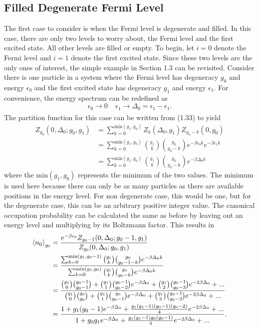 \subsection{Filled Degenerate Fermi Level}
The first case to consider is when the Fermi level is degenerate and filled. In this case, there are only two levels to worry about, the Fermi level and the first excited state. All other levels are filled or empty. To begin, let $i=0$ denote the Fermi level and $i=1$ denote the first excited state. Since these two levels are the only ones of interest, the simple example in Section 1.3 can be revisited. Consider there is one particle in a system where the Fermi level has degeneracy $g_0$ and energy $\epsilon_0$ and the first excited state has degeneracy $g_1$ and energy $\epsilon_1$. For convenience, the energy spectrum can be redefined as
\begin{equation}
    \epsilon_0 \xrightarrow[]{} 0\ \ \ \ \ \epsilon_1\xrightarrow[]{}\Delta_0=\epsilon_1-\epsilon_1.\nonumber
\end{equation}
The partition function for this case can be written from (1.33) to yield
\begin{align}
    Z_{g_0}(0,\Delta_0;g_0,g_1)&=\sum_{k=0}^{\text{min}(g_1,g_0)} Z_k(\Delta_0,g_1)Z_{g_0-k}(0,g_0)\nonumber\\
    &=\sum_{k=0}^{\text{min}(g_1,g_0)} {g_1 \choose k}{g_0\choose g_0-k} e^{-\beta \epsilon_0 k}e^{-\beta \epsilon_1 k}\nonumber\\
    &=\sum_{k=0}^{\text{min}(g_1,g_0)} {g_1 \choose k}{g_0\choose g_0-k} e^{-\beta \Delta_0 k}
\end{align}
where the $\text{min}(g_1,g_0)$ represents the minimum of the two values. The minimum is used here because there can only be as many particles as there are available positions in the energy level. For non degenerate case, this would be one, but for the degenerate case, this can be an arbitrary positive integer value. The canonical occupation probability can be calculated the same as before by leaving out an energy level and multiplying by its Boltzmann factor. This results in 
\begin{align}
    \left<{n_0}\right>_{g_0}&=\frac{e^{-\beta \epsilon_0}Z_{g_0-1}(0,\Delta_0;g_0-1,g_1)}{Z_{g_0}(0,\Delta_0;g_0,g_1)}\nonumber\\
    &=\frac{\sum_{k=0}^{\text{min}(g_1,g_0-1)} {g_1 \choose k}{g_0\choose g_0-1-k} e^{-\beta \Delta_0 k}}{\sum_{k=0}^{\text{min}(g_1,g_0)} {g_1 \choose k}{g_0\choose g_0-k} e^{-\beta \Delta_0 k }}\nonumber\\
    &=\frac{{g_1\choose 0}{g_0-1\choose g_0-1}+{g_1 \choose 1}{g_0-1\choose g_0-2}e^{-\beta\Delta_0}+{g_1\choose 2}{g_0-1\choose g_0-3}e^{-2\beta\Delta_0}+...}{{g_1\choose 0}{g_0\choose g_0}+{g_1 \choose 1}{g_0\choose g_0-1}e^{-\beta\Delta_0}+{g_1\choose 2}{g_0-1\choose g_0-2}e^{-2\beta\Delta_0}+...}\nonumber\\
    &=\frac{1+g_1(g_0-1)e^{-\beta\Delta_0}+\frac{g_1(g_1-1)(g_0-1)(g_0-2)}{4}e^{-2\beta\Delta_0}+...}{1+g_0g_1e^{-\beta\Delta_0}+\frac{g_1(g_1-1)g_0(g_0-1)}{4}e^{-2\beta\Delta_0}+...}.
\end{align}
